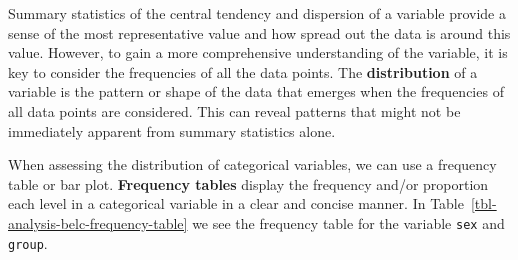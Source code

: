 \documentclass[
  letterpaper,
  krantz1]{latex/krantz-mod}
\theoremstyle{definition}
\theoremstyle{definition}
\theoremstyle{remark}
\begin{document}
Summary statistics of the central tendency and dispersion of a variable
provide a sense of the most representative value and how spread out the
data is around this value. However, to gain a more comprehensive
understanding of the variable, it is key to consider the frequencies of
all the data points. The \textbf{distribution} of a
variable is the pattern or shape of the data that emerges when the
frequencies of all data points are considered. This can reveal patterns
that might not be immediately apparent from summary statistics alone.

When assessing the distribution of categorical variables, we can use a
frequency table or bar plot. \textbf{Frequency
tables} display the frequency and/or proportion
each level in a categorical variable in a
clear and concise manner. In
Table~\ref{tbl-analysis-belc-frequency-table} we see the frequency table
for the variable \texttt{sex} and \texttt{group}.

\begin{table}

\caption{\label{tbl-analysis-belc-frequency-table}Frequency table for
variables \texttt{sex} and \texttt{group}.}

\begin{minipage}{0.50\linewidth}



\end{minipage}%
%
\begin{minipage}{0.50\linewidth}



\end{minipage}%

\end{table}%
\end{document}
